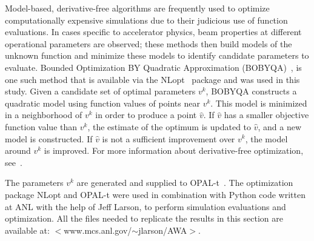 Model-based, derivative-free algorithms are frequently used to optimize
computationally expensive simulations due to their judicious use of function
evaluations. In cases specific to accelerator physics, 
beam properties at different operational parameters are observed;
these methods then build models of the unknown
function and minimize these models to identify candidate parameters to 
evaluate. Bounded Optimization BY Quadratic Approximation (BOBYQA)~\cite{bobyqa},
 is one such method that is available via the
NLopt~\cite{nlopt} package and was used in this study. 
Given a candidate set of optimal parameters $v^k$, BOBYQA
constructs a quadratic model using function values of points near $v^k$. 
This model is minimized in a neighborhood of $v^k$ in order to produce a point $\hat{v}$. 
If $\hat{v}$ has a smaller objective function value than $v^k$, 
the estimate of the optimum is updated to $\hat{v}$, and a new model is constructed. 
If $\hat{v}$ is not a sufficient improvement over $v^k$, 
the model around $v^k$ is improved. For more
information about derivative-free optimization, see~\cite{Conn2009a}.

The parameters $v^k$ are generated and supplied to OPAL-t~\cite{opal}. 
The optimization package NLopt and OPAL-t were used
in combination with Python code written at ANL with the help 
of Jeff Larson, to perform simulation evaluations and optimization.
All the files needed to replicate the results in this section are available at: 
$<$www.mcs.anl.gov/$\sim$jlarson/AWA$>$.  

